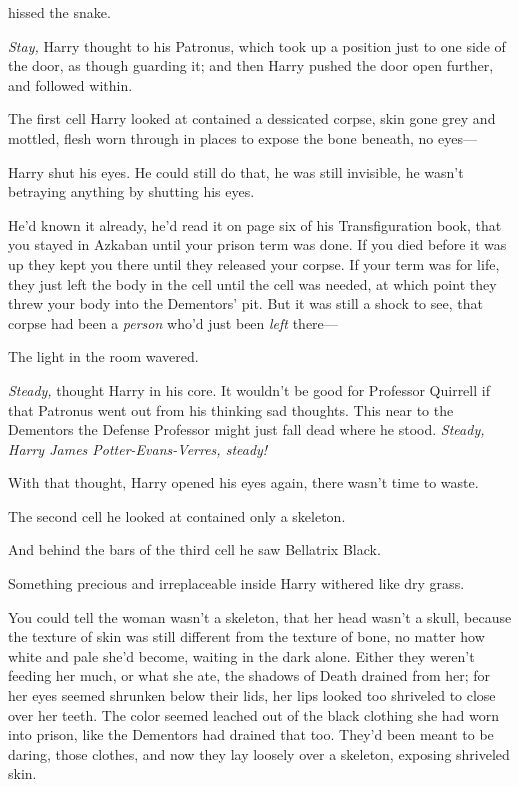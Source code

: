  hissed the snake.

\emph{Stay,} Harry thought to his Patronus, which took up a position just to
one side of the door, as though guarding it; and then Harry pushed the door
open further, and followed within.

The first cell Harry looked at contained a dessicated corpse, skin gone grey
and mottled, flesh worn through in places to expose the bone beneath, no eyes\mbox{---}

Harry shut his eyes. He could still do that, he was still invisible, he wasn't
betraying anything by shutting his eyes.

He'd known it already, he'd read it on page six of his Transfiguration book,
that you stayed in Azkaban until your prison term was done. If you died before
it was up they kept you there until they released your corpse. If your term was
for life, they just left the body in the cell until the cell was needed, at
which point they threw your body into the Dementors' pit. But it was still a
shock to see, that corpse had been a \emph{person} who'd just been \emph{left}
there\mbox{---}

The light in the room wavered.

\emph{Steady,} thought Harry in his core. It wouldn't be good for Professor
Quirrell if that Patronus went out from his thinking sad thoughts. This near to
the Dementors the Defense Professor might just fall dead where he stood.
\emph{Steady, Harry James Potter-Evans-Verres, steady!}

With that thought, Harry opened his eyes again, there wasn't time to waste.

The second cell he looked at contained only a skeleton.

And behind the bars of the third cell he saw Bellatrix Black.

Something precious and irreplaceable inside Harry withered like dry grass.

You could tell the woman wasn't a skeleton, that her head wasn't a skull,
because the texture of skin was still different from the texture of bone, no
matter how white and pale she'd become, waiting in the dark alone. Either they
weren't feeding her much, or what she ate, the shadows of Death drained from
her; for her eyes seemed shrunken below their lids, her lips looked too
shriveled to close over her teeth. The color seemed leached out of the black
clothing she had worn into prison, like the Dementors had drained that too.
They'd been meant to be daring, those clothes, and now they lay loosely over a
skeleton, exposing shriveled skin.

